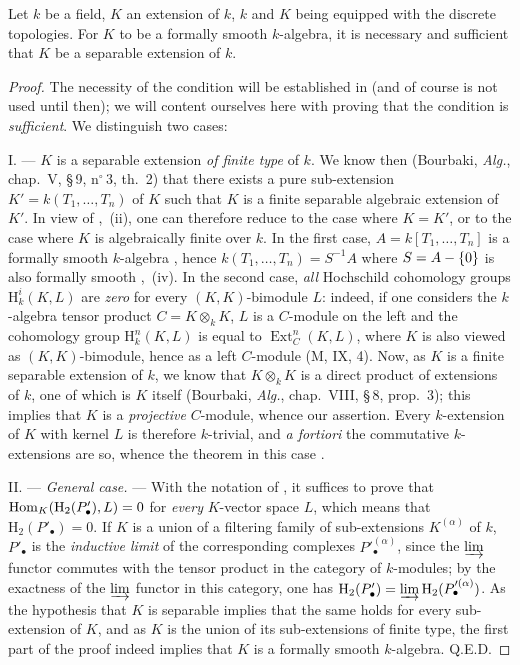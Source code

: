 \begin{theorem}[19.6.1][Cohen]
\label{0.19.6.1}
Let $k$ be a field, $K$ an extension of $k$, $k$ and $K$ being equipped with the discrete topologies.
For $K$ to be a formally smooth $k$-algebra, it is necessary and sufficient that $K$ be a separable extension of $k$.
\end{theorem}

\begin{proof}
The necessity of the condition will be established in  (and of course is not used until then);
we will content ourselves here with proving that the condition is \emph{sufficient}.
We distinguish two cases:

I. --- $K$ is a separable extension \emph{of finite type} of $k$.
We know then (Bourbaki, \emph{Alg.}, chap.~V, \S\,9, n$^\circ$\,3, th.~2) that there exists a pure sub-extension $K'=k(T_1,\ldots,T_n)$ of $K$ such that $K$ is a finite separable algebraic extension of $K'$.
  In view of ,~(ii), one can therefore reduce to the case where $K=K'$, or to the case where $K$ is algebraically finite over $k$.
In the first case, $A=k[T_1,\ldots,T_n]$ is a formally smooth $k$-algebra , hence $k(T_1,\ldots,T_n)=S^{-1}A$ where $S=A-\{0\}$ is also formally smooth ,~(iv).
In the second case, \emph{all} Hochschild cohomology groups $\mathrm{H}^i_k(K,L)$ are \emph{zero} for every $(K,K)$-bimodule $L$:
indeed, if one considers the $k$-algebra tensor product $C=K\otimes_k K$, $L$ is a $C$-module on the left and the cohomology group $\mathrm{H}^n_k(K,L)$ is equal to $\operatorname{Ext}^n_C(K,L)$, where $K$ is also viewed as $(K,K)$-bimodule,
hence as a left $C$-module (M, IX, 4).
Now, as $K$ is a finite separable extension of $k$, we know that $K\otimes_k K$ is a direct product of extensions of $k$, one of which is $K$ itself (Bourbaki, \emph{Alg.}, chap.~VIII, \S\,8, prop.~3);
this implies that $K$ is a \emph{projective} $C$-module, whence our assertion.
Every $k$-extension of $K$ with kernel $L$ is therefore $k$-trivial, and \emph{a fortiori} the commutative $k$-extensions are so, whence the theorem in this case .

II. --- \emph{General case.} ---
With the notation of , it suffices to prove that $\operatorname{Hom}_K(\mathrm{H}_2(P'_\bullet),L)=0$ for \emph{every} $K$-vector space $L$, which means that $\mathrm{H}_2(P'_\bullet)=0$.
If $K$ is a union of a filtering family of sub-extensions $K^{(\alpha)}$ of $k$, $P'_\bullet$ is the \emph{inductive limit} of the corresponding complexes $P'^{(\alpha)}_\bullet$, since the $\varinjlim$ functor commutes with the tensor product in the category of $k$-modules;
by the exactness of the $\varinjlim$ functor in this category, one has $\mathrm{H}_2(P'_\bullet)=\varinjlim\mathrm{H}_2(P'^{(\alpha)}_\bullet)$.
As the hypothesis that $K$ is separable implies that the same holds for every sub-extension of $K$, and as $K$ is the union of its sub-extensions of finite type, the first part of the proof indeed implies that $K$ is a formally smooth $k$-algebra. Q.E.D.
\end{proof}

